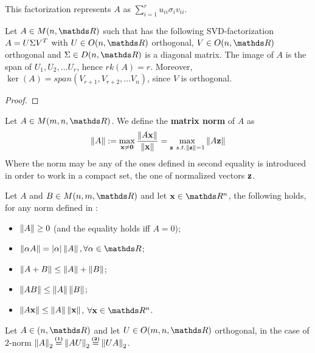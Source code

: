 \documentclass[computationalMathematics.tex]{subfiles}
\begin{document}
This factorization represents $A$ as $\sum\limits_{i=1}^r u_{ii} \sigma_i v_{ii}$. 

\begin{proposition}
	Let $A \in M(n, \R)$ such that has the following SVD-factorization $A = U \Sigma {V}^{T}$ with $U \in O(n, \R)$ orthogonal, $V \in O(n, \R)$ orthogonal and $\Sigma \in D(n, \R)$ is a diagonal matrix.
	The image of $A$ is the span of $U_1, U_2, \ldots U_r$, hence $rk(A) = r$.
	Moreover, $\ker(A)=span(V_{r+1}, V_{r+2}, \ldots V_{n})$, since $V$ is orthogonal.
\end{proposition}

\begin{proof}
\end{proof}

\begin{definition}
  Let $A \in M(m, n, \R)$. We define the \textbf{matrix norm} of $A$ as
  \[
    \left\lVert A\right\rVert := \max\limits_{{\bf x } \neq {\bf 0 }} \frac{\left\lVert A{\bf x }\right\rVert}{\left\lVert{\bf x }\right\rVert} = \max\limits_{{\bf z } ~ s.t. \left\lVert{\bf z }\right\rVert=1}\left\lVert A{\bf z }\right\rVert
  \]
  Where the norm may be any of the ones defined in  second equality is introduced in order to work in a compact set, the one of normalized vectors ${\bf z }$.
\end{definition}

\begin{property}\label{prop:28sett_norms}
  Let $A$ and $B \in M(n, m, \R)$ and let $\vect{x} \in \R^n$, the following holds, for any norm defined in :
  \begin{itemize}
    \item $\left\lVert A\right\rVert \ge 0$ (and the equality holds iff $A=0$);
    \item $\norm{\alpha A} = |\alpha| \norm{A}, \forall \alpha \in \R$;
    \item $\left\lVert A+B\right\rVert \le \left\lVert A\right\rVert + \left\lVert B\right\rVert$;
    \item $\left\lVert AB\right\rVert \le \left\lVert A\right\rVert \left\lVert B\right\rVert$;
    \item $\left\lVert A{\bf x }\right\rVert \le \left\lVert A\right\rVert \left\lVert{\bf x }\right\rVert$, $\forall \vect{x} \in \R^n$.
  \end{itemize}
\end{property}

\begin{proposition}\label{fact:28sett_orthogonorm}
  Let $A \in (n, \R)$ and let $U \in O(m, n, \R)$ orthogonal, in the case of $2$-norm $\norm{A}_2 \numeq{(1)} \norm{AU}_2 \numeq{(2)} \norm{UA}_2$.
\end{proposition}
\end{document}

